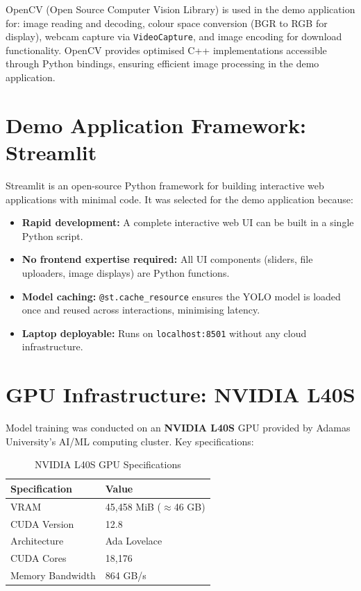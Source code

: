 OpenCV (Open Source Computer Vision Library) is used in the demo application for: image reading and decoding, colour space conversion (BGR to RGB for display), webcam capture via \texttt{VideoCapture}, and image encoding for download functionality. OpenCV provides optimised C++ implementations accessible through Python bindings, ensuring efficient image processing in the demo application.

\section{Demo Application Framework: Streamlit}

Streamlit \cite{streamlit2024} is an open-source Python framework for building interactive web applications with minimal code. It was selected for the demo application because:
\begin{itemize}
    \item \textbf{Rapid development:} A complete interactive web UI can be built in a single Python script.
    \item \textbf{No frontend expertise required:} All UI components (sliders, file uploaders, image displays) are Python functions.
    \item \textbf{Model caching:} \texttt{@st.cache\_resource} ensures the YOLO model is loaded once and reused across interactions, minimising latency.
    \item \textbf{Laptop deployable:} Runs on \texttt{localhost:8501} without any cloud infrastructure.
\end{itemize}

\section{GPU Infrastructure: NVIDIA L40S}

Model training was conducted on an \textbf{NVIDIA L40S} GPU provided by Adamas University's AI/ML computing cluster. Key specifications:

\begin{table}[H]
\centering
\caption{NVIDIA L40S GPU Specifications}
\label{tab:gpu}
\begin{tabular}{ll}
\toprule
\textbf{Specification} & \textbf{Value} \\
\midrule
VRAM          & 45,458 MiB ($\approx$46 GB) \\
CUDA Version  & 12.8 \\
Architecture  & Ada Lovelace \\
CUDA Cores    & 18,176 \\
Memory Bandwidth & 864 GB/s \\
\bottomrule
\end{tabular}
\end{table}

